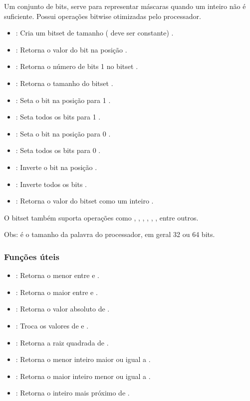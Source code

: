 Um conjunto de bits, serve para representar máscaras quando um inteiro não é suficiente. Possui operações bitwise otimizadas pelo processador.
\begin{itemize}\setlength\itemsep{0pt}
    \item {}: Cria um bitset de tamanho  ( deve ser constante) .
    \item {}: Retorna o valor do bit na posição  .
    \item {}: Retorna o número de bits 1 no bitset .
    \item {}: Retorna o tamanho do bitset .
    \item {}: Seta o bit na posição  para 1 .
    \item {}: Seta todos os bits para 1 .
    \item {}: Seta o bit na posição  para 0 .
    \item {}: Seta todos os bits para 0 .
    \item {}: Inverte o bit na posição  .
    \item {}: Inverte todos os bits .
    \item {}: Retorna o valor do bitset como um inteiro .
\end{itemize}

O bitset também suporta operações como \code{\&}, \code{|}, \code{\^}, \code{\~}, \code{<<}, \code{>>}, entre outros.

Obs:  é o tamanho da palavra do processador, em geral 32 ou 64 bits.

\subsubsection{Funções úteis}

\begin{itemize}\setlength\itemsep{0pt}
    \item {}: Retorna o menor entre  e  .
    \item {}: Retorna o maior entre  e  .
    \item {}: Retorna o valor absoluto de  .
    \item {}: Troca os valores de  e  .
    \item {}: Retorna a raiz quadrada de  .
    \item {}: Retorna o menor inteiro maior ou igual a  .
    \item {}: Retorna o maior inteiro menor ou igual a  .
    \item {}: Retorna o inteiro mais próximo de  .
\end{itemize}

